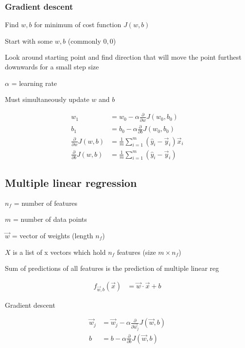 \documentclass[12pt]{article}
\begin{document}
\subsubsection{Gradient descent}

Find $w,b$ for minimum of cost function $J(w,b)$

\begin{myenumerate}
	\item Start with some $w,b$ (commonly $0,0$)
	\item Look around starting point and find direction that will move the point furthest downwards for a small step size
\end{myenumerate}

$\alpha$ = learning rate

Must simultaneously update $w$ and $b$

\begin{align*}
    w_1 &= w_0 - \alpha \frac{\partial}{\partial w} J(w_0,b_0)\\
    b_1 &= b_0 - \alpha \frac{\partial}{\partial b} J(w_0,b_0)\\
    \frac{\partial}{\partial w} J(w,b) &= \frac{1}{m} \sum_{i=1}^m ({\hat y}_i - \vec{y}_i) \vec{x}_i\\
    \frac{\partial}{\partial b} J(w,b) &= \frac{1}{m} \sum_{i=1}^m ({\hat y}_i - \vec{y}_i)
\end{align*}

\subsection{Multiple linear regression}

$n_f$ = number of features

$m$ = number of data points

$\vec{w}$ = vector of weights (length $n_f$)

$X$ is a list of x vectors which hold $n_f$ features (size $m \times n_f$)

Sum of predictions of all features is the prediction of multiple linear reg

\begin{align*}
    f_{\vec{w},b}(\vec{x}) &= \vec{w} \cdot \vec{x} + b
\end{align*}

Gradient descent

\begin{align*}
    \vec{w}_j &= \vec{w}_j - \alpha \frac{\partial}{\partial \vec{w}_j} J(\vec{w},b)\\
    b &= b - \alpha \frac{\partial}{\partial b} J(\vec{w},b)
\end{align*}
\end{document}
